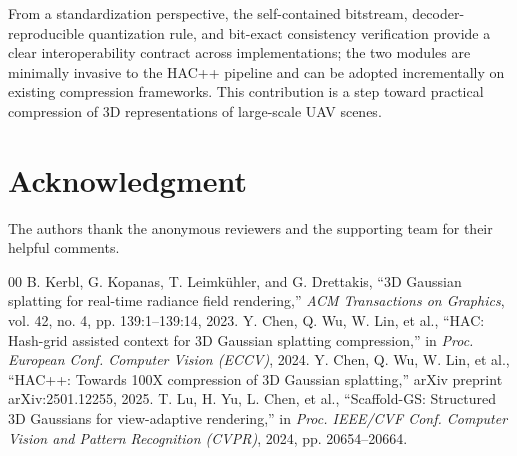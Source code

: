\documentclass[conference]{IEEEtran}
\begin{document}
From a standardization perspective, the self-contained bitstream,
decoder-reproducible quantization rule, and bit-exact consistency
verification provide a clear interoperability contract across
implementations; the two modules are minimally invasive to the HAC++
pipeline and can be adopted incrementally on existing compression
frameworks. This contribution is a step toward practical compression of
3D representations of large-scale UAV scenes.

\section*{Acknowledgment}
The authors thank the anonymous reviewers and the supporting team for
their helpful comments.

\begin{thebibliography}{00}
 B. Kerbl, G. Kopanas, T. Leimk\"uhler, and G.
Drettakis, ``3D Gaussian splatting for real-time radiance field
rendering,'' \emph{ACM Transactions on Graphics}, vol. 42, no. 4, pp.
139:1--139:14, 2023.
 Y. Chen, Q. Wu, W. Lin, et al., ``HAC: Hash-grid
assisted context for 3D Gaussian splatting compression,'' in \emph{Proc.
European Conf. Computer Vision (ECCV)}, 2024.
 Y. Chen, Q. Wu, W. Lin, et al., ``HAC++: Towards 100X
compression of 3D Gaussian splatting,'' arXiv preprint
arXiv:2501.12255, 2025.
 T. Lu, H. Yu, L. Chen, et al., ``Scaffold-GS: Structured
3D Gaussians for view-adaptive rendering,'' in \emph{Proc. IEEE/CVF Conf.
Computer Vision and Pattern Recognition (CVPR)}, 2024, pp.
20654--20664.
\end{thebibliography}
\end{document}
